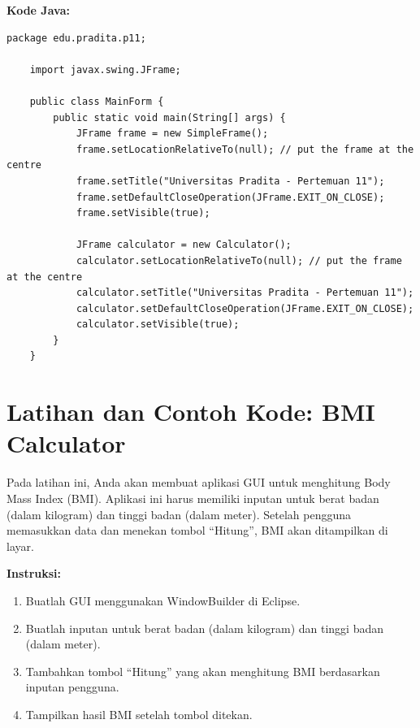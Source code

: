 \textbf{Kode Java:}
\begin{lstlisting}[style=JavaStyle]
	package edu.pradita.p11;
	
	import javax.swing.JFrame;
	
	public class MainForm {
		public static void main(String[] args) {
			JFrame frame = new SimpleFrame();
			frame.setLocationRelativeTo(null); // put the frame at the centre
			frame.setTitle("Universitas Pradita - Pertemuan 11");
			frame.setDefaultCloseOperation(JFrame.EXIT_ON_CLOSE);
			frame.setVisible(true);
			
			JFrame calculator = new Calculator();
			calculator.setLocationRelativeTo(null); // put the frame at the centre
			calculator.setTitle("Universitas Pradita - Pertemuan 11");
			calculator.setDefaultCloseOperation(JFrame.EXIT_ON_CLOSE);
			calculator.setVisible(true);
		}
	}
\end{lstlisting}


\section{Latihan dan Contoh Kode: BMI Calculator}

Pada latihan ini, Anda akan membuat aplikasi GUI untuk menghitung Body Mass Index (BMI). Aplikasi ini harus memiliki inputan untuk berat badan (dalam kilogram) dan tinggi badan (dalam meter). Setelah pengguna memasukkan data dan menekan tombol “Hitung”, BMI akan ditampilkan di layar.

\textbf{Instruksi:}
\begin{enumerate}
	\item Buatlah GUI menggunakan WindowBuilder di Eclipse.
	\item Buatlah inputan untuk berat badan (dalam kilogram) dan tinggi badan (dalam meter).
	\item Tambahkan tombol “Hitung” yang akan menghitung BMI berdasarkan inputan pengguna.
	\item Tampilkan hasil BMI setelah tombol ditekan.
\end{enumerate}


